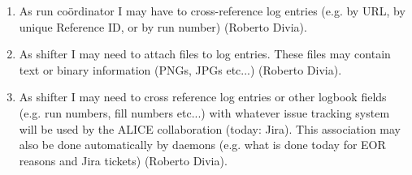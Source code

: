 \begin{enumerate}
  \item As run co\"ordinator I may have to cross-reference log entries (e.g. by URL, by unique Reference ID, or by run number)  (Roberto Divia).
  \item  As shifter I may need to attach files to log entries. These files may contain text or binary information (PNGs, JPGs etc...) (Roberto Divia).
  \item As shifter I may need to cross reference log entries or other logbook fields (e.g. run numbers, fill numbers etc...) with whatever issue tracking system will be used by the ALICE collaboration (today: Jira). This association may also be done automatically by daemons (e.g. what is done today for EOR reasons and Jira tickets) (Roberto Divia).

\end{enumerate}

